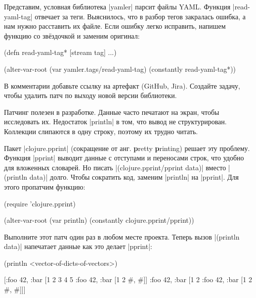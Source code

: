 Представим, условная библиотека \spverb|yamler| парсит файлы YAML. Функция
\spverb|read-yaml-tag| отвечает за теги. Выяснилось, что в разбор тегов
закралась ошибка, а нам нужно расставить их файле. Если ошибку легко исправить,
напишем функцию со зв\"{е}здочкой и заменим оригинал:

\begin{english}
  \begin{clojure}
(defn read-yaml-tag* [stream tag]
  ...)

(alter-var-root
 (var yamler.tags/read-yaml-tag)
 (constantly read-yaml-tag*))
  \end{clojure}
\end{english}

В комментарии добавьте ссылку на артефакт (GitHub, Jira). Создайте задачу,
чтобы удалить патч по выходу новой версии библиотеки.

Патчинг полезен в разработке. Данные часто печатают на экран, чтобы исследовать
их. Недостаток \spverb|println| в том, что вывод не структурирован. Коллекции
слипаются в одну строку, поэтому их трудно читать.


Пакет \spverb|clojure.pprint| (сокращение от анг. \textbf{p}retty \textbf{p}rinting)
решает эту проблему. Функция \spverb|pprint| выводит данные с отступами и переносами строк,
что удобно для вложенных словарей. Но писать \spverb|(clojure.pprint/pprint data)|
вместо \spverb|(println data)| долго. Чтобы сократить код, заменим \spverb|println|
на \spverb|pprint|. Для этого пропатчим функцию:

\begin{english}
  \begin{clojure}
(require 'clojure.pprint)

(alter-var-root
 (var println)
 (constantly clojure.pprint/pprint))
  \end{clojure}
\end{english}

Выполните этот патч один раз в любом месте проекта. Теперь вызов
\spverb|(println data)| напечатает данные как это делает \spverb|pprint|:

\begin{english}
  \begin{clojure}
(println <vector-of-dicts-of-vectors>)

[{:foo 42, :bar [1 2 3 4 5 {:foo 42, :bar [1 2 {#, #}]}]}
 {:foo 42, :bar [1 2 {:foo 42, :bar [1 2 {#, #}]}]}]
  \end{clojure}
\end{english}

